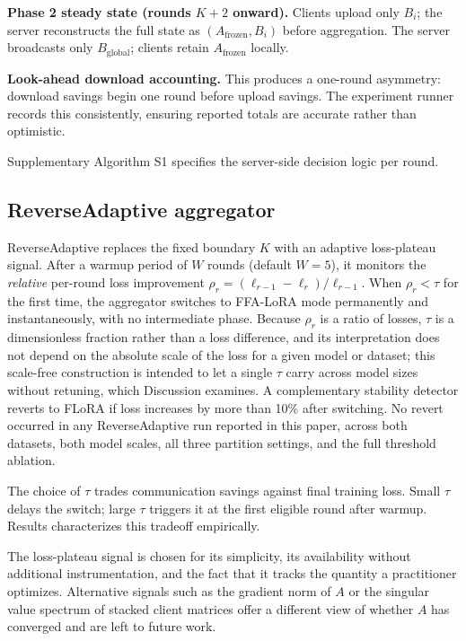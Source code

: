 \documentclass[pdflatex,sn-nature,lineno]{sn-jnl}
\begin{document}
\textbf{Phase 2 steady state (rounds $K{+}2$ onward).}
Clients upload only $B_i$; the server reconstructs the full state as $(A_{\text{frozen}}, B_i)$ before aggregation. The server broadcasts only $B_{\text{global}}$; clients retain $A_{\text{frozen}}$ locally.

\textbf{Look-ahead download accounting.}
This produces a one-round asymmetry: download savings begin one round before upload savings. The experiment runner records this consistently, ensuring reported totals are accurate rather than optimistic.

Supplementary Algorithm S1 specifies the server-side decision logic per round.

\subsection{ReverseAdaptive aggregator}
ReverseAdaptive replaces the fixed boundary $K$ with an adaptive loss-plateau signal. After a warmup period of $W$ rounds (default $W{=}5$), it monitors the \emph{relative} per-round loss improvement $\rho_r = (\ell_{r-1} - \ell_r) / \ell_{r-1}$. When $\rho_r < \tau$ for the first time, the aggregator switches to FFA-LoRA \cite{sun2024ffalora} mode permanently and instantaneously, with no intermediate phase. Because $\rho_r$ is a ratio of losses, $\tau$ is a dimensionless fraction rather than a loss difference, and its interpretation does not depend on the absolute scale of the loss for a given model or dataset; this scale-free construction is intended to let a single $\tau$ carry across model sizes without retuning, which Discussion examines. A complementary stability detector reverts to FLoRA if loss increases by more than 10\% after switching. No revert occurred in any ReverseAdaptive run reported in this paper, across both datasets, both model scales, all three partition settings, and the full threshold ablation.

The choice of $\tau$ trades communication savings against final training loss. Small $\tau$ delays the switch; large $\tau$ triggers it at the first eligible round after warmup. Results characterizes this tradeoff empirically.

The loss-plateau signal is chosen for its simplicity, its availability without additional instrumentation, and the fact that it tracks the quantity a practitioner optimizes. Alternative signals such as the gradient norm of $A$ or the singular value spectrum of stacked client matrices offer a different view of whether $A$ has converged and are left to future work.
\end{document}
